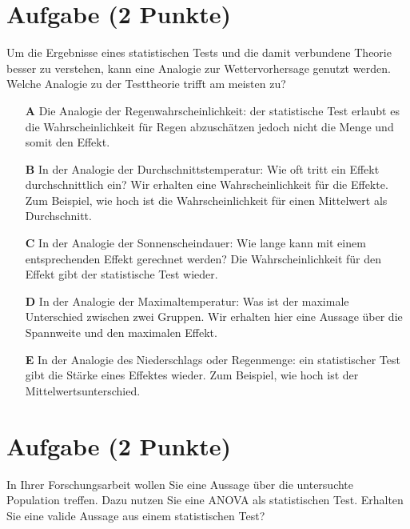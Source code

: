 \documentclass[a4paper, 9pt]{scrartcl}\usepackage[]{graphicx}\usepackage[]{xcolor}
\begin{document}
\section{Aufgabe \hfill (2 Punkte)}



Um die Ergebnisse eines statistischen Tests und die damit verbundene Theorie besser zu verstehen, kann eine Analogie zur Wettervorhersage genutzt werden. Welche Analogie zu der Testtheorie trifft am meisten zu?



\begin{enumerate}
\item [\textbf{A} \msquare] Die Analogie der Regenwahrscheinlichkeit: der statistische Test erlaubt es die Wahrscheinlichkeit für Regen abzuschätzen jedoch nicht die Menge und somit den Effekt.
\item [\textbf{B} \msquare] In der Analogie der Durchschnittstemperatur: Wie oft tritt ein Effekt durchschnittlich ein? Wir erhalten eine Wahrscheinlichkeit für die Effekte. Zum Beispiel, wie hoch ist die Wahrscheinlichkeit für einen Mittelwert als Durchschnitt.
\item [\textbf{C} \msquare] In der Analogie der Sonnenscheindauer: Wie lange kann mit einem entsprechenden Effekt gerechnet werden? Die Wahrscheinlichkeit für den Effekt gibt der statistische Test wieder.
\item [\textbf{D} \msquare] In der Analogie der Maximaltemperatur: Was ist der maximale Unterschied zwischen zwei Gruppen. Wir erhalten hier eine Aussage über die Spannweite und den maximalen Effekt.
\item [\textbf{E} \msquare] In der Analogie des Niederschlags oder Regenmenge: ein statistischer Test gibt die Stärke eines Effektes wieder. Zum Beispiel, wie hoch ist der Mittelwertsunterschied.
\end{enumerate}

\section{Aufgabe \hfill (2 Punkte)}



In Ihrer Forschungsarbeit wollen Sie eine Aussage über die untersuchte Population treffen. Dazu nutzen Sie eine ANOVA als statistischen Test. Erhalten Sie eine valide Aussage aus einem statistischen Test?
\end{document}
